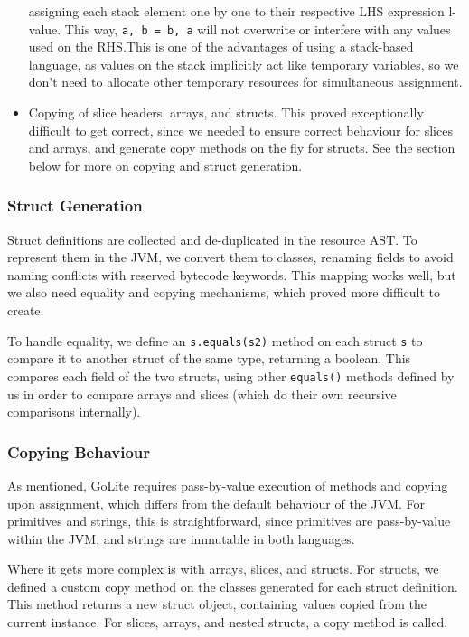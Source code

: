 \documentclass[11pt]{article}
\begin{document}
\begin{itemize}
    assigning each stack element one by one to their respective LHS
    expression l-value. This way, \texttt{a, b = b, a} will not
    overwrite or interfere with any values used on the RHS.\@ This is
    one of the advantages of using a stack-based language, as values
    on the stack implicitly act like temporary variables, so we don't
    need to allocate other temporary resources for simultaneous
    assignment.
  \item Copying of slice headers, arrays, and structs. This proved
    exceptionally difficult to get correct, since we needed to ensure
    correct behaviour for slices and arrays, and generate copy methods
    on the fly for structs. See the section below for more on copying and
    struct generation.
\end{itemize}

\subsubsection{Struct Generation}

Struct definitions are collected and de-duplicated in the resource AST.
To represent them in the JVM, we convert them to classes, renaming fields
to avoid naming conflicts with reserved bytecode keywords. This mapping
works well, but we also need equality and copying mechanisms, which proved
more difficult to create.

To handle equality, we define an \texttt{s.equals(s2)} method on each struct
\texttt{s} to compare it to another struct of the same type, returning a boolean.
This compares each field of the two structs, using other \texttt{equals()} methods
defined by us in order to compare arrays and slices (which do their own recursive
comparisons internally).

\subsubsection{Copying Behaviour}

As mentioned, GoLite requires pass-by-value execution of methods and copying upon
assignment, which differs from the default behaviour of the JVM. For primitives and
strings, this is straightforward, since primitives are pass-by-value within the JVM,
and strings are immutable in both languages.

Where it gets more complex is with arrays, slices, and structs. For structs, we defined
a custom copy method on the classes generated for each struct definition. This method
returns a new struct object, containing values copied from the current instance. For
slices, arrays, and nested structs, a copy method is called.
\end{document}
